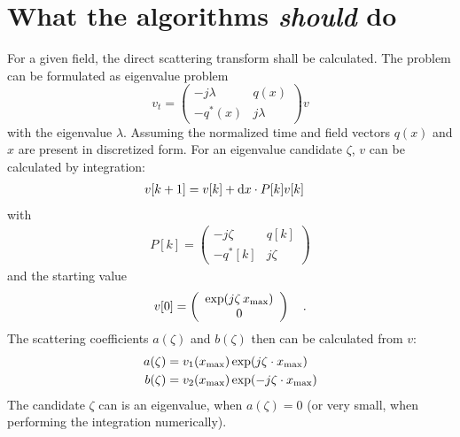 \documentclass{article}
\begin{document}
\section{What the algorithms \textit{should} do}
For a given field, the direct scattering transform shall be calculated. 
The problem can be formulated as eigenvalue problem
$$ v_t = \left(\begin{array}{cc}-j\lambda & q(x)\\-q^*(x) & j\lambda\end{array}\right)v $$
with the eigenvalue $\lambda$.
Assuming the normalized time and field vectors  $q(x)$ and $x$ are present in discretized form. For an eigenvalue candidate $\zeta$,   $v$ can be calculated  by integration:
\begin{align}v[k+1] &= v[k] + {\rm d}x \cdot P[k] v[k] \end{align}
with
\begin{align}P[k] = \left( \begin{array}{cc}-j\zeta&q[k]\\-q^*[k]&j\zeta\end{array} \right )
\end{align}
and the starting value 
\begin{align} 
v[0] = \left( \begin{array}{c}\exp( j  \zeta\, x_{\rm max}) \\ 0 \end{array} \right) \quad .
\end{align}
The scattering coefficients $a(\zeta)$ and $b(\zeta)$ then can be calculated from $v$:
\begin{align}
a(\zeta) &= v_1(x_{\rm max})\exp(j\zeta \cdot x_{\rm max})\\
b(\zeta) &= v_2(x_{\rm max})\exp(-j\zeta \cdot  x_{\rm max})
\end{align}
The candidate $\zeta$ can is an eigenvalue, when $a(\zeta) = 0$ (or very small, when performing the integration numerically).
\end{document}
